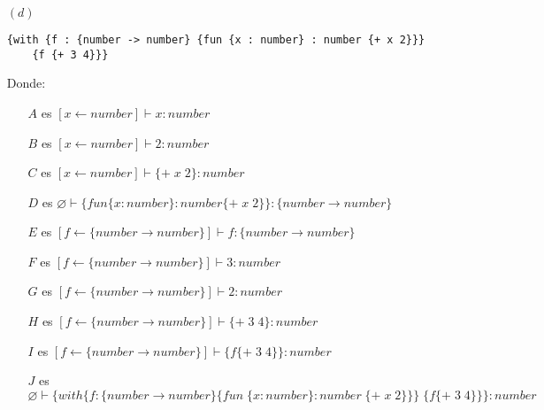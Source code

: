 \documentclass[letterpaper,11pt]{article}
\begin{document}
\begin{enumerate}
\begin{itemize}
\begin{prooftree}
        \end{prooftree}
        \item [$(d)$]\begin{verbatim}{with {f : {number -> number} {fun {x : number} : number {+ x 2}}} 
    {f {+ 3 4}}}
        \end{verbatim}
        \begin{prooftree}
        \end{prooftree}
        Donde:
        \begin{itemize}
            \item [$A$] es $[x\leftarrow number]\vdash x:number$
            \item [$B$] es $[x\leftarrow number]\vdash 2:number$
            \item [$C$] es $[x\leftarrow number]\vdash \{+\; x\; 2\}:number$
            \item [$D$] es $\varnothing \vdash \{fun\{x:number\}:number\{+\;x\;2\}\}:\{number\rightarrow number\}$
            \item [$E$] es $[f\leftarrow\{number \rightarrow number\}] \vdash f:\{number\rightarrow number\}$
            \item [$F$] es $[f \leftarrow \{number \rightarrow number\}]\vdash 3:number$
            \item [$G$] es $[f \leftarrow \{number \rightarrow number\}]\vdash 2:number$
            \item [$H$] es $[f\leftarrow \{number\rightarrow number\}]\vdash\{+\;3\;4\}:number$
            \item [$I$] es $[f\leftarrow\{number\rightarrow number\}]\vdash \{f\{+\;3\;4\}\}:number$
            \item [$J$] es $\varnothing \vdash \{with \{f:\{number\rightarrow number\}\{fun \;\{x:number\}:number\;\{+\;x\;2\}\}\}\;\{f\{+\;3\;4\}\}\}:number$

\end{itemize}
\end{itemize}
\end{enumerate}
\end{document}
